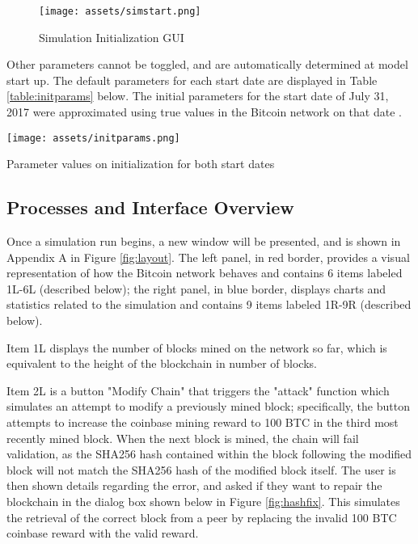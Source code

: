 \documentclass[12pt]{report}
\begin{document}
\begin{figure}[h!]
\texttt{[image: assets/simstart.png]}
\caption{Simulation Initialization GUI}
\label{fig:initGUI}
\end{figure}

\newpage

Other parameters cannot be toggled, and are automatically determined at model start up. The default parameters for each start date are displayed in Table \ref{table:initparams} below. The initial parameters for the start date of July 31, 2017 were approximated using true values in the Bitcoin network on that date \cite{blockchain.info.}.

\begin{table}[h!]
\begin{center}
\texttt{[image: assets/initparams.png]}
\end{center}
\caption{Parameter values on initialization for both start dates}
\label{table:initparams}
\end{table}



\subsection{Processes and Interface Overview}
\label{sec:intro}
Once a simulation run begins, a new window will be presented, and is shown in Appendix A in Figure \ref{fig:layout}. The left panel, in red border, provides a visual representation of how the Bitcoin network behaves and contains 6 items labeled 1L-6L (described below); the right panel, in blue border, displays charts and statistics related to the simulation and contains 9 items labeled 1R-9R (described below).

Item 1L displays the number of blocks mined on the network so far, which is equivalent to the height of the blockchain in number of blocks. 

Item 2L is a button "Modify Chain" that triggers the "attack" function which simulates an attempt to modify a previously mined block; specifically, the button attempts to increase the coinbase mining reward to 100 BTC in the third most recently mined block. When the next block is mined, the chain will fail validation, as the SHA256 hash contained within the block following the modified block will not match the SHA256 hash of the modified block itself. The user is then shown details regarding the error, and asked if they want to repair the blockchain in the dialog box shown below in Figure \ref{fig:hashfix}. This simulates the retrieval of the correct block from a peer by replacing the invalid 100 BTC coinbase reward with the valid reward.
\end{document}
